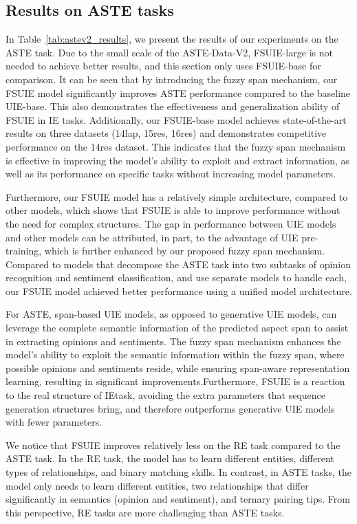 \documentclass[11pt]{article}
\begin{document}
\subsection{Results on ASTE tasks}



In Table~\ref{tab:astev2_results}, we present the results of our experiments on the ASTE task. Due to the small scale of the ASTE-Data-V2, FSUIE-large is not needed to achieve better results, and this section only uses FSUIE-base for comparison. It can be seen that by introducing the fuzzy span mechanism, our FSUIE model significantly improves ASTE performance compared to the baseline UIE-base. This also demonstrates the effectiveness and generalization ability of FSUIE in IE tasks. Additionally, our FSUIE-base model achieves state-of-the-art results on three datasets (14lap, 15res, 16res) and demonstrates competitive performance on the 14res dataset. This indicates that the fuzzy span mechanism is effective in improving the model's ability to exploit and extract information, as well as its performance on specific tasks without increasing model parameters. 


Furthermore, our FSUIE model has a relatively simple architecture, compared to other models, which shows that FSUIE is able to improve performance without the need for complex structures. The gap in performance between UIE models and other models can be attributed, in part, to the advantage of UIE pre-training, which is further enhanced by our proposed fuzzy span mechanism.
Compared to models that decompose the ASTE task into two subtasks of opinion recognition and sentiment classification, and use separate models to handle each, our FSUIE model achieved better performance using a unified model architecture. 


For ASTE, span-based UIE models, as opposed to generative UIE models, can leverage the complete semantic information of the predicted aspect span to assist in extracting opinions and sentiments. The fuzzy span mechanism enhances the model's ability to exploit the semantic information within the fuzzy span, where possible opinions and sentiments reside, while ensuring span-aware representation learning, resulting in significant improvements.Furthermore, FSUIE is a reaction to the real structure of IEtask, avoiding the extra parameters that sequence generation structures bring, and therefore outperforms generative UIE models with fewer parameters.


We notice that FSUIE improves relatively less on the RE task compared to the ASTE task. In the RE task, the model has to learn different entities, different types of relationships, and binary matching skills. In contrast, in ASTE tasks, the model only needs to learn different entities, two relationships that differ significantly in semantics (opinion and sentiment), and ternary pairing tips. From this perspective, RE tasks are more challenging than ASTE tasks.
\end{document}
